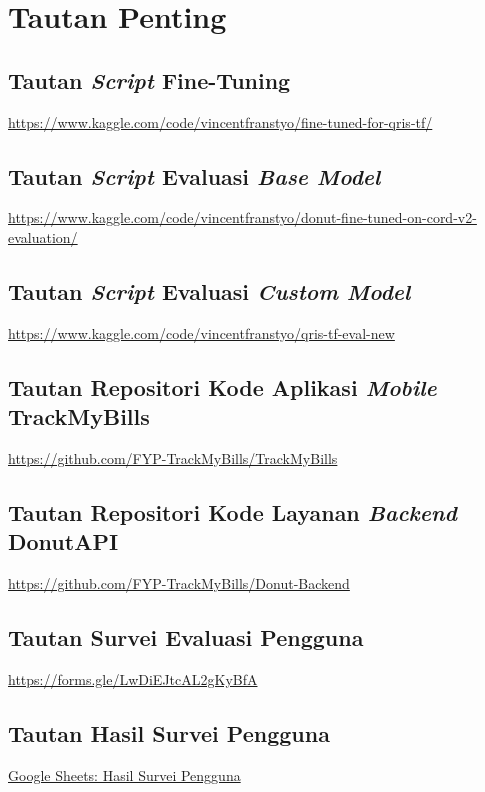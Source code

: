 \chapter{Tautan Penting}
\label{chapter:tautan-penting}

\section{Tautan \emph{Script} Fine-Tuning}
\href{https://www.kaggle.com/code/vincentfranstyo/fine-tuned-for-qris-tf/}{https://www.kaggle.com/code/vincentfranstyo/fine-tuned-for-qris-tf/}

\section{Tautan \emph{Script} Evaluasi \emph{Base Model}}
\href{https://www.kaggle.com/code/vincentfranstyo/donut-fine-tuned-on-cord-v2-evaluation/}{https://www.kaggle.com/code/vincentfranstyo/donut-fine-tuned-on-cord-v2-evaluation/}

\section{Tautan \emph{Script} Evaluasi \emph{Custom Model}}
\href{https://www.kaggle.com/code/vincentfranstyo/qris-tf-eval-new}{https://www.kaggle.com/code/vincentfranstyo/qris-tf-eval-new}

\section{Tautan Repositori Kode Aplikasi \emph{Mobile} TrackMyBills}
\href{https://github.com/FYP-TrackMyBills/TrackMyBills}{https://github.com/FYP-TrackMyBills/TrackMyBills}

\section{Tautan Repositori Kode Layanan \emph{Backend} DonutAPI}
\href{https://github.com/FYP-TrackMyBills/Donut-Backend}
{https://github.com/FYP-TrackMyBills/Donut-Backend}

\section{Tautan Survei Evaluasi Pengguna}
\href{https://forms.gle/LwDiEJtcAL2gKyBfA}{https://forms.gle/LwDiEJtcAL2gKyBfA}

\section{Tautan Hasil Survei Pengguna}
\href{https://docs.google.com/spreadsheets/d/1a2Q1Kio0whC7-fwUD3y7AQzv5Cw0PaTOwEdsp9prtck/edit?resourcekey=&gid=529123852#gid=529123852}{Google Sheets: Hasil Survei Pengguna}